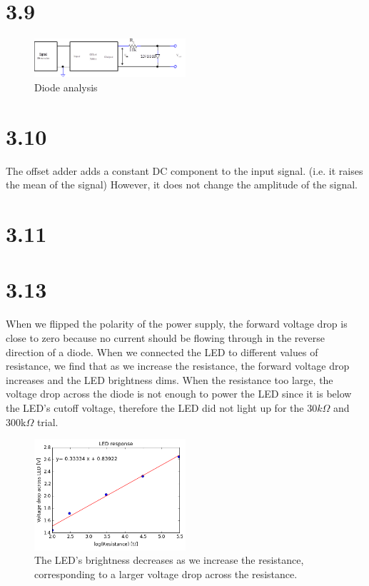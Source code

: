 \documentclass[authoryear, 12pt,5p, times]{elsarticle}
\begin{document}
\section*{3.9}
\begin{figure}[h!]
\center
\includegraphics[width=0.5\textwidth]{figure/3_3_setup}
\caption{Diode analysis }
\label{3_3_setup}
\end{figure}
\section*{3.10}

The offset adder adds a constant DC component to the input signal. (i.e. it raises the mean of the signal) However, it does not change the amplitude of the signal. 
\section*{3.11}


\section*{3.13}
When we flipped the polarity of the power supply, the forward voltage drop is close to zero because no current should be flowing through in the reverse direction of a diode. When we connected the LED to different values of resistance, we find that as we increase the resistance, the forward voltage drop increases and the LED brightness dims. When the resistance too large, the voltage drop across the diode is not enough to power the LED since it is below the LED's cutoff voltage, therefore the LED did not light up for the $30k\Omega$ and 300k$\Omega$ trial.
\begin{figure}[h!]
\center
\includegraphics[width=0.5\textwidth]{figure/3_13_LED}
\caption{The LED's brightness decreases as we increase the resistance, corresponding to a larger voltage drop across the resistance.}
\label{3_13_LED}
\end{figure}
\end{document}
